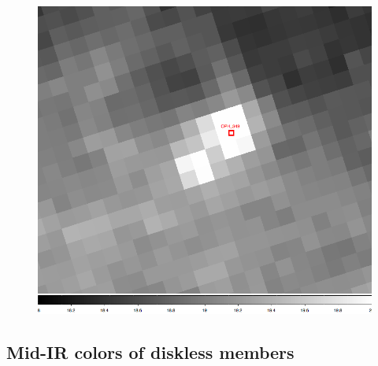 \begin{figure}[ht!]
\begin{minipage}[b]{0.3\linewidth}
\end{minipage}
\hspace{0.5cm}
\begin{minipage}[b]{0.3\linewidth}
\centering
\includegraphics[scale=0.15]{chIMACS/figures/OPH_349_IRAC4_image}
\end{minipage}
\end{figure}

\subsection{Mid-IR colors of diskless members}

